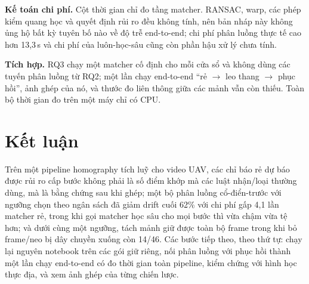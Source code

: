 \documentclass[conference]{IEEEtran}
\begin{document}
\textbf{Kế toán chi phí.} Cột thời gian chỉ đo tầng matcher. RANSAC, warp, các
phép kiểm quang học và quyết định rủi ro đều không tính, nên bản nháp này không
ủng hộ bất kỳ tuyên bố nào về độ trễ end-to-end; chi phí phân luồng thực tế cao
hơn 13,3\,s và chi phí của luôn-học-sâu cũng còn phần hậu xử lý chưa tính.

\textbf{Tích hợp.} RQ3 chạy một matcher cố định cho mỗi cửa sổ và không dùng
các tuyến phân luồng từ RQ2; một lần chạy end-to-end ``rẻ $\to$ leo thang $\to$
phục hồi'', ảnh ghép của nó, và thước đo liên thông giữa các mảnh vẫn còn
thiếu. Toàn bộ thời gian đo trên một máy chỉ có CPU.

\section{Kết luận}
Trên một pipeline homography tích luỹ cho video UAV, các chỉ báo rẻ dự báo được
rủi ro cấp bước không phải là số điểm khớp mà các luật nhận/loại thường dùng,
mà là bằng chứng sau khi ghép; một bộ phân luồng cổ-điển-trước với ngưỡng chọn
theo ngân sách đã giảm drift cuối 62\% với chi phí gấp 4,1 lần matcher rẻ, trong
khi gọi matcher học sâu cho mọi bước thì vừa chậm vừa tệ hơn; và dưới cùng một
ngưỡng, tách mảnh giữ được toàn bộ frame trong khi bỏ frame/neo bị dây chuyền
xuống còn 14/46. Các bước tiếp theo, theo thứ tự: chạy lại nguyên notebook trên
các gói giữ riêng, nối phân luồng với phục hồi thành một lần chạy end-to-end có
đo thời gian toàn pipeline, kiểm chứng với hình học thực địa, và xem ảnh ghép
của từng chiến lược.
\end{document}
